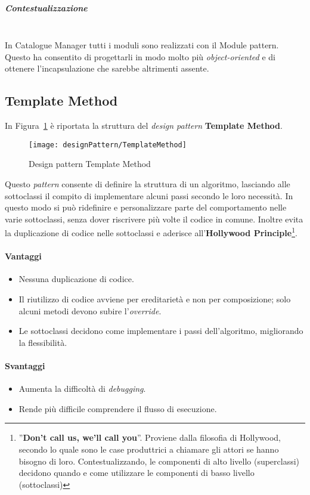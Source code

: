 \subparagraph{Contestualizzazione} \mbox{} \\
In Catalogue Manager tutti i moduli sono realizzati con il Module pattern. Questo ha consentito di progettarli in modo molto più \textit{object-oriented} e di ottenere l'incapsulazione che sarebbe altrimenti assente.

\subsection{Template Method} 
In Figura~\ref{fig:templateMethod} è riportata la struttura del \textit{design pattern} \textbf{Template Method}.
\begin{figure}[h]
  \begin{center}
    \texttt{[image: designPattern/TemplateMethod]}
  \caption[Design pattern Template Method]{Design pattern Template Method}
  \label{fig:templateMethod}
  \end{center} 
\end{figure}

Questo \textit{pattern} consente di definire la struttura di un algoritmo, lasciando alle sottoclassi il compito di implementare alcuni passi secondo le loro necessità. In questo modo si può ridefinire e personalizzare parte del comportamento nelle varie sottoclassi, senza dover riscrivere più volte il codice in comune. Inoltre evita la duplicazione di codice nelle sottoclassi e aderisce all'\textbf{Hollywood Principle}\footnote{''\textbf{Don't call us, we'll call you}''. Proviene dalla filosofia di Hollywood, secondo lo quale sono le case produttrici a chiamare gli attori se hanno bisogno di loro. Contestualizzando, le componenti di alto livello (superclassi) decidono quando e come utilizzare le componenti di basso livello (sottoclassi)}. 

\paragraph{Vantaggi}
\begin{itemize}
\item Nessuna duplicazione di codice.
\item Il riutilizzo di codice avviene per ereditarietà e non per composizione; solo alcuni metodi devono subire l'\textit{override}.
\item Le sottoclassi decidono come implementare i passi dell'algoritmo, migliorando la flessibilità.
\end{itemize}

\paragraph{Svantaggi}
\begin{itemize}
\item Aumenta la difficoltà di \textit{debugging}.
\item Rende più difficile comprendere il flusso di esecuzione.
\end{itemize}

